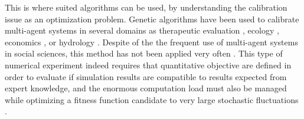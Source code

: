 \documentclass[10pt]{article}
\begin{document}
This is where suited algorithms can be used, by understanding the calibration issue as an optimization problem. Genetic algorithms have been used to calibrate multi-agent systems in several domains as therapeutic evaluation \citep{castiglione2007optimization}, ecology \citep{duboz2010application}, economics \citep{espinosa2012genetic,stonedahl2010evolutionary}, or hydrology \citep{solomatine1999automatic}. Despite of the the frequent use of multi-agent systems in social sciences, this method has not been applied very often \citep{heppenstall2007genetic,stonedahl2010evolutionary}. This type of numerical experiment indeed requires that quantitative objective are defined in order to evaluate if simulation results are compatible to results expected from expert knowledge, and the enormous computation load must also be managed while optimizing a fitness function candidate to very large stochastic fluctuations \citep{di2004applying}.
\end{document}
